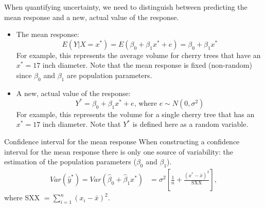 \documentclass[10pt]{beamer}
\begin{document}
\begin{frame}
When quantifying uncertainty, we need to distinguish between predicting the mean response and a new, actual value of the response.
\begin{itemize}
\item The mean response:
$$E(Y| X=x^*) = E(\beta_0 + \beta_1 x^* + e) = \beta_0 + \beta_1 x^*$$
For example, this represents the average volume for cherry trees that have an $x^*=17$ inch diameter.  Note that the mean response is fixed (non-random) since $\beta_0$ and $\beta_1$ are population parameters.
\vspace{10pt}
\item A new, actual value of the response:
$$Y^* = \beta_0 + \beta_1 x^* + e \text{, where } e \sim N(0,\sigma^2)$$ 
For example, this represents the volume for a single cherry tree that has an  $x^*=17$ inch diameter.  Note that $Y^*$ is defined here as a random variable.
\end{itemize}
\end{frame}


\begin{frame}{Confidence interval for the mean response}
When constructing a confidence interval for the mean response there is only one source of variability: the estimation of the population parameters ($\beta_0$ and $\beta_1$).
\begin{align*}
Var(\hat{y}^*) = Var(\hat{\beta}_0 + \hat{\beta}_1 x^*)
&= \sigma^2 \left[ \frac{1}{n} + \frac{(x^* - \bar{x})^2}{\text{SXX}} \right],
\end{align*}
where SXX $= \sum_{i=1}^n (x_i - \bar{x})^2$.
\end{frame}
\end{document}
